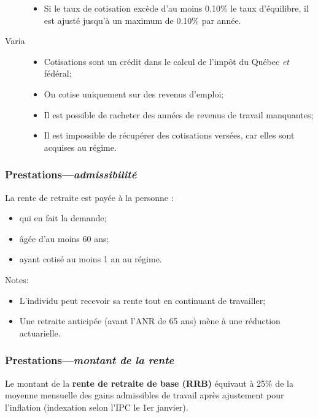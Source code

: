 \documentclass[10pt, french]{article}
\begin{document}
\begin{multicols*}{3}
\begin{description}
\begin{itemize}[leftmargin = *]
		\item	Si le taux de cotisation excède d'au moins 0.10\% le taux d'équilibre, il est ajusté jusqu'à un maximum de 0.10\% par année.
		\end{itemize}
	\item[Varia]
		\begin{itemize}[leftmargin = *]
			\item	Cotisations sont un crédit dans le calcul de l'impôt du Québec \textit{et} fédéral;
			\item	On cotise uniquement sur des revenus d'emploi;
			\item	Il est possible de racheter des années de revenus de travail manquantes;
			\item	Il est impossible de récupérer des cotisations versées, car elles sont acquises au régime.
		\end{itemize}
\end{description}


\subsubsection*{Prestations---\textit{admissibilité}}

La rente de retraite est payée à la personne :
\begin{itemize}[leftmargin = *]
	\item	qui en fait la demande;
	\item	âgée d'au moins 60 ans;
	\item	ayant cotisé au moins 1 an au régime.
\end{itemize}

Notes:
\begin{itemize}[leftmargin = *]
	\item	L'individu peut recevoir sa rente tout en continuant de travailler;
	\item	Une retraite anticipée (avant l'ANR de 65 ans) mène à une réduction actuarielle.
\end{itemize}

\subsubsection*{Prestations---\textit{montant de la rente}}

Le montant de la \textbf{rente de retraite de base (RRB)} équivaut à 25\% de la moyenne mensuelle des gains admissibles de travail après ajustement pour l'inflation (indexation selon l'IPC le 1er janvier).


\end{multicols*}
\end{document}
